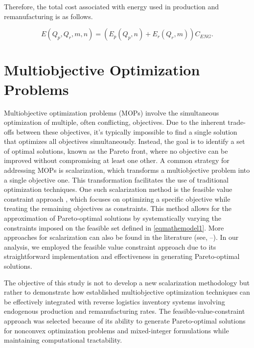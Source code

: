 \documentclass[11pt]{article}
\begin{document}
\noindent Therefore, the total cost associated with energy used in production and remanufacturing is as follows.

\begin{equation}
    E(Q_p, Q_r, m , n)= \left(E_p(Q_p, n)+E_r(Q_r, m) \right)C_{ENG}.
\end{equation}


%



\section{Multiobjective Optimization Problems} \label{MOP}
\noindent Multiobjective optimization problems (MOPs) involve the simultaneous optimization of multiple, often conflicting, objectives. Due to the inherent trade-offs between these objectives, it's typically impossible to find a single solution that optimizes all objectives simultaneously. Instead, the goal is to identify a set of optimal solutions, known as the Pareto front, where no objective can be improved without compromising at least one other. A common strategy for addressing MOPs is scalarization, which transforms a multiobjective problem into a single objective one. This transformation facilitates the use of traditional optimization techniques. One such scalarization method is the feasible value constraint approach \cite{BurKayRiz2017}, which focuses on optimizing a specific objective while treating the remaining objectives as constraints. This method allows for the approximation of Pareto-optimal solutions by systematically varying the constraints imposed on the feasible set defined in \eqref{eqmathemodel1}. More approaches for scalarization can also be found in the literature (see, \cite{PascolettiSerafini1984}--\cite{Burachik2014}). In our analysis, we employed the feasible value constraint approach due to its straightforward implementation and effectiveness in generating Pareto-optimal solutions. 

\noindent The objective of this study is not to develop a new scalarization methodology but rather to demonstrate how established multiobjective optimization techniques can be effectively integrated with reverse logistics inventory systems involving endogenous production and remanufacturing rates. The feasible-value-constraint approach was selected because of its ability to generate Pareto-optimal solutions for nonconvex optimization problems and mixed-integer formulations while maintaining computational tractability.
\end{document}
